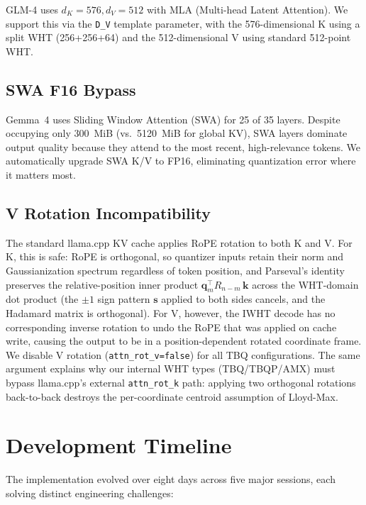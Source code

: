 \documentclass[10pt,twocolumn]{article}
\begin{document}
GLM-4 uses $d_K=576, d_V=512$ with MLA (Multi-head Latent Attention). We support this via the \texttt{D\_V} template parameter, with the 576-dimensional K using a split WHT (256+256+64) and the 512-dimensional V using standard 512-point WHT.

\subsection{SWA F16 Bypass}

Gemma~4 uses Sliding Window Attention (SWA) for 25 of 35 layers. Despite occupying only 300~MiB (vs.\ 5120~MiB for global KV), SWA layers dominate output quality because they attend to the most recent, high-relevance tokens. We automatically upgrade SWA K/V to FP16, eliminating quantization error where it matters most.

\subsection{V Rotation Incompatibility}

The standard llama.cpp KV cache applies RoPE rotation to both K and V. For K, this is safe: RoPE is orthogonal, so quantizer inputs retain their norm and Gaussianization spectrum regardless of token position, and Parseval's identity preserves the relative-position inner product $\mathbf{q}_m^\top R_{n-m}\, \mathbf{k}$ across the WHT-domain dot product (the $\pm 1$ sign pattern $\mathbf{s}$ applied to both sides cancels, and the Hadamard matrix is orthogonal). For V, however, the IWHT decode has no corresponding inverse rotation to undo the RoPE that was applied on cache write, causing the output to be in a position-dependent rotated coordinate frame. We disable V rotation (\texttt{attn\_rot\_v=false}) for all TBQ configurations. The same argument explains why our internal WHT types (TBQ/TBQP/AMX) must bypass llama.cpp's external \texttt{attn\_rot\_k} path: applying two orthogonal rotations back-to-back destroys the per-coordinate centroid assumption of Lloyd-Max.

\section{Development Timeline}
\label{sec:timeline}

The implementation evolved over eight days across five major sessions, each solving distinct engineering challenges:
\end{document}
